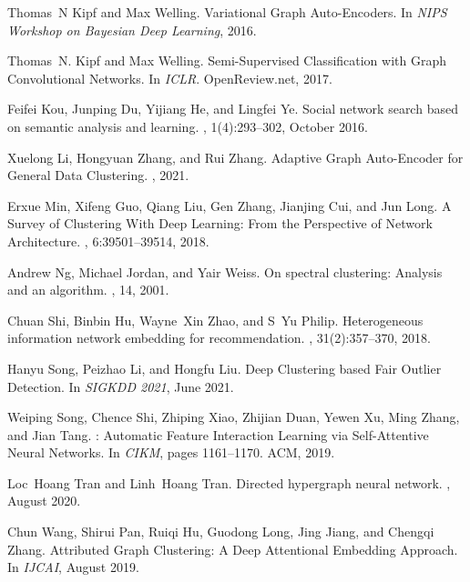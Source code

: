 \documentclass[11pt]{article}
\begin{document}
\begin{thebibliography}{10}
Thomas~N Kipf and Max Welling.
\newblock Variational {Graph} {Auto}-{Encoders}.
\newblock In {\em {NIPS} {Workshop} on {Bayesian} {Deep} {Learning}}, 2016.

Thomas~N. Kipf and Max Welling.
\newblock Semi-{Supervised} {Classification} with {Graph} {Convolutional}
  {Networks}.
\newblock In {\em ICLR}. OpenReview.net, 2017.

Feifei Kou, Junping Du, Yijiang He, and Lingfei Ye.
\newblock Social network search based on semantic analysis and learning.
, 1(4):293--302,
  October 2016.

Xuelong Li, Hongyuan Zhang, and Rui Zhang.
\newblock Adaptive {Graph} {Auto}-{Encoder} for {General} {Data} {Clustering}.
,
  2021.

Erxue Min, Xifeng Guo, Qiang Liu, Gen Zhang, Jianjing Cui, and Jun Long.
\newblock A {Survey} of {Clustering} {With} {Deep} {Learning}: {From} the
  {Perspective} of {Network} {Architecture}.
, 6:39501--39514, 2018.

Andrew Ng, Michael Jordan, and Yair Weiss.
\newblock On spectral clustering: Analysis and an algorithm.
, 14, 2001.

Chuan Shi, Binbin Hu, Wayne~Xin Zhao, and S~Yu Philip.
\newblock Heterogeneous information network embedding for recommendation.
, 31(2):357--370, 2018.

Hanyu Song, Peizhao Li, and Hongfu Liu.
\newblock Deep {Clustering} based {Fair} {Outlier} {Detection}.
\newblock In {\em {SIGKDD} 2021}, June 2021.

Weiping Song, Chence Shi, Zhiping Xiao, Zhijian Duan, Yewen Xu, Ming Zhang, and
  Jian Tang.
: {Automatic} {Feature} {Interaction} {Learning} via
  {Self}-{Attentive} {Neural} {Networks}.
\newblock In {\em CIKM}, pages 1161--1170. ACM, 2019.

Loc~Hoang Tran and Linh~Hoang Tran.
\newblock Directed hypergraph neural network.
, August 2020.

Chun Wang, Shirui Pan, Ruiqi Hu, Guodong Long, Jing Jiang, and Chengqi Zhang.
\newblock Attributed {Graph} {Clustering}: {A} {Deep} {Attentional} {Embedding}
  {Approach}.
\newblock In {\em IJCAI}, August 2019.


\end{thebibliography}
\end{document}
